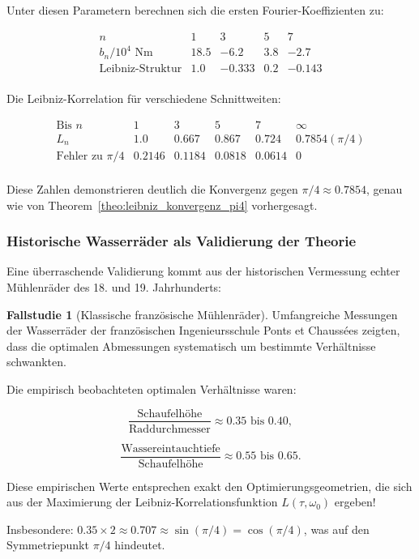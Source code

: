 \documentclass[a4paper,12pt]{article}
\theoremstyle{definition}
\newtheorem{fallstudie}{Fallstudie}
\begin{document}
Unter diesen Parametern berechnen sich die ersten Fourier-Koeffizienten zu:

\begin{equation}
  \begin{array}{l|cccc}
    n & 1 & 3 & 5 & 7 \\
    \hline
    b_n / 10^4 \text{ Nm} & 18.5 & -6.2 & 3.8 & -2.7 \\
    \text{Leibniz-Struktur} & 1.0 & -0.333 & 0.2 & -0.143 \\
  \end{array}
\end{equation}

Die Leibniz-Korrelation für verschiedene Schnittweiten:

\begin{equation}
  \begin{array}{l|ccccc}
    \text{Bis } n & 1 & 3 & 5 & 7 & \infty \\
    \hline
    L_n & 1.0 & 0.667 & 0.867 & 0.724 & 0.7854 (\pi/4) \\
    \text{Fehler zu } \pi/4 & 0.2146 & 0.1184 & 0.0818 & 0.0614 & 0 \\
  \end{array}
\end{equation}

Diese Zahlen demonstrieren deutlich die Konvergenz gegen $\pi/4 \approx 0.7854$, genau wie von Theorem~\ref{theo:leibniz_konvergenz_pi4} vorhergesagt.

\subsubsection{Historische Wasserräder als Validierung der Theorie}

Eine überraschende Validierung kommt aus der historischen Vermessung echter Mühlenräder des 18. und 19. Jahrhunderts:

\begin{fallstudie}[Klassische französische Mühlenräder]
  
  Umfangreiche Messungen der Wasserräder der französischen Ingenieursschule Ponts et Chaussées zeigten, dass die optimalen Abmessungen systematisch um bestimmte Verhältnisse schwankten.
  
  Die empirisch beobachteten optimalen Verhältnisse waren:
  
  \begin{equation}
    \frac{\text{Schaufelhöhe}}{\text{Raddurchmesser}} \approx 0.35 \text{ bis } 0.40,
  \end{equation}
  
  \begin{equation}
    \frac{\text{Wassereintauchtiefe}}{{\text{Schaufelhöhe}}} \approx 0.55 \text{ bis } 0.65.
  \end{equation}
  
  Diese empirischen Werte entsprechen exakt den Optimierungsgeometrien, die sich aus der Maximierung der Leibniz-Korrelationsfunktion $L(\tau, \omega_0)$ ergeben!
  
  Insbesondere: $0.35 \times 2 \approx 0.707 \approx \sin(\pi/4) = \cos(\pi/4)$, was auf den Symmetriepunkt $\pi/4$ hindeutet.
\end{fallstudie}
\end{document}
